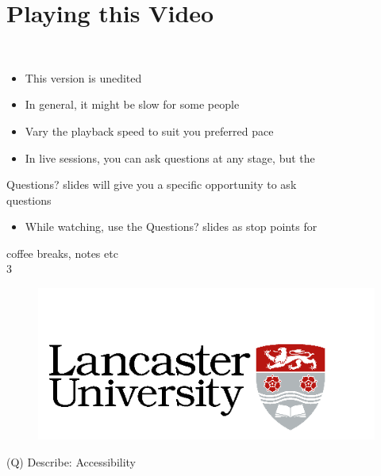 \documentclass[12pt]{article}
\begin{document}
\section{Playing this Video}
\\
\begin{itemize}
  \item This version is unedited
  \item In general, it might be slow for some people
  \item Vary the playback speed to suit you preferred pace
  \item In live sessions, you can ask questions at any stage, but the 
\end{itemize}
Questions? slides will give you a specific opportunity to ask \\
questions\\
\begin{itemize}
  \item While watching, use the Questions? slides as stop points for 
\end{itemize}
coffee breaks, notes etc\\
3\\
\begin{figure}[H]
\includegraphics[width=0.5\linewidth]{page1-image-1.png}
\end{figure}
\clearpage
(Q)
Describe: Accessibility
\clearpage
\end{document}
